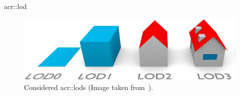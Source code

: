 \documentclass[10pt]{beamer}
\begin{document}
            \begin{frame}{\texorpdfstring{\acrfull*{acr::lod}}{Level of Detail}}
                \begin{figure}[H]
                    \centering
                    \includegraphics[width=\textwidth]{images/introduction/lods_3}
                    \caption{Considered \glspl{acr::lod} (Image taken from~\parencite{biljecki2016improved}).}
                \end{figure}
            \end{frame}
\end{document}

